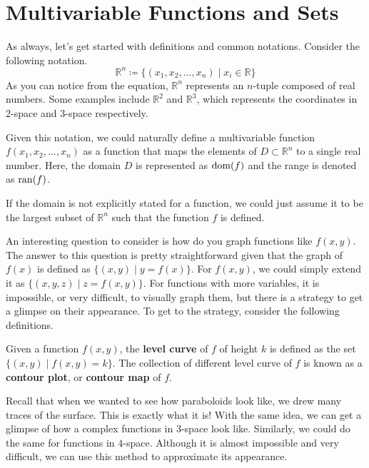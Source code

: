 \documentclass[../../../main.tex]{subfiles}
\begin{document}
\section{Multivariable Functions and Sets}

As always, let's get started with definitions and common notations.
Consider the following notation.
\[
\mathbb{R}^n
\coloneqq \{ (x_1, x_2, \ldots, x_n) \mid x_i \in \mathbb{R} \}
\]
As you can notice from the equation, $\mathbb{R}^n$ represents an
$n$-tuple composed of real numbers. Some examples include
$\mathbb{R}^2$ and $\mathbb{R}^3$, which represents the coordinates in
2-space and 3-space respectively.

\begin{important}
Given this notation, we could naturally define a multivariable
function $f(x_1, x_2, \ldots, x_n)$ as a function that maps
the elements of $D \subset \mathbb{R}^n$ to a single real number.
Here, the domain $D$ is represented as $\operatorname{dom}(f)$ and the range
is denoted as $\operatorname{ran}(f)$.
\end{important}

If the domain is not explicitly stated for a function, we could just
assume it to be the largest subset of $\mathbb{R}^n$ such that the
function $f$ is defined.

An interesting question to consider is how do you graph functions like
$f(x, y)$. The answer to this question is pretty straightforward given
that the graph of $f(x)$ is defined as $\{ (x, y) \mid y = f(x) \}$.
For $f(x, y)$, we could simply extend it as $\{ (x, y, z) \mid
z = f(x, y) \}$. For functions with more variables, it is impossible,
or very difficult, to visually graph them, but there is a strategy
to get a glimpse on their appearance. To get to the strategy,
consider the following definitions.

\begin{definition}{}{}
Given a function $f(x, y)$, the \textbf{level curve} of $f$ of height
$k$ is defined as the set $\{ (x, y) \mid f(x, y) = k \}$.
The collection of different level curve of $f$ is known as a
\textbf{contour plot}, or \textbf{contour map} of $f$.
\end{definition}

Recall that when we wanted to see how paraboloids look like,
we drew many traces of the surface. This is exactly what it is!
With the same idea, we can get a glimpse of how a complex functions
in 3-space look like. Similarly, we could do the same for functions
in $4$-space. Although it is almost impossible and very difficult,
we can use this method to approximate its appearance.
\end{document}
